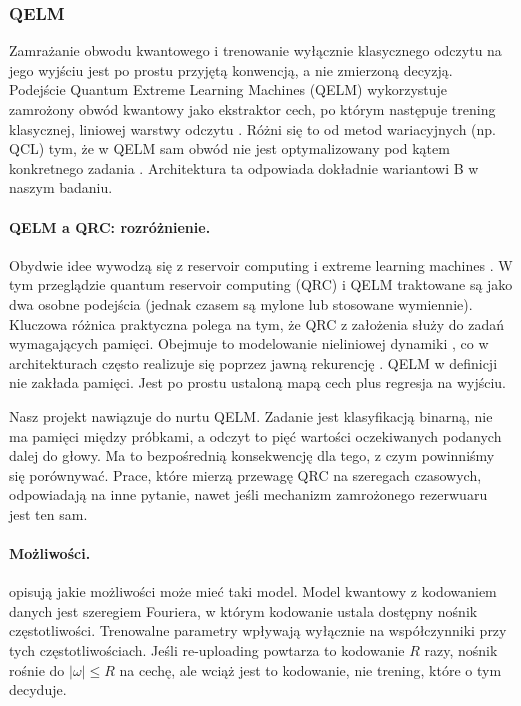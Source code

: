 \documentclass[11pt, a4paper]{article}
\begin{document}
\subsubsection{QELM}
Zamrażanie obwodu kwantowego i trenowanie wyłącznie klasycznego odczytu na jego wyjściu jest po prostu przyjętą konwencją, a nie zmierzoną decyzją. Podejście Quantum Extreme Learning Machines (QELM) wykorzystuje zamrożony obwód kwantowy jako ekstraktor cech, po którym następuje trening klasycznej, liniowej warstwy odczytu \citep{xiong2023}. Różni się to od metod wariacyjnych (np. QCL) tym, że w QELM sam obwód nie jest optymalizowany pod kątem konkretnego zadania \citep{sakurai2026}. Architektura ta odpowiada dokładnie wariantowi B w naszym badaniu.

\paragraph{QELM a QRC: rozróżnienie.}

Obydwie idee wywodzą się z reservoir computing i extreme learning machines \citep{mujal2021}. W tym przeglądzie quantum reservoir computing (QRC) i QELM traktowane są jako dwa osobne podejścia (jednak czasem są mylone lub stosowane wymiennie). Kluczowa różnica praktyczna polega na tym, że QRC z założenia służy do zadań wymagających pamięci. Obejmuje to modelowanie nieliniowej dynamiki \citep{fujii2017}, co w architekturach często realizuje się poprzez jawną rekurencję \citep{pandey2026b}. QELM w definicji \citet{xiong2023} nie zakłada pamięci. Jest po prostu ustaloną mapą cech plus regresja na wyjściu.

Nasz projekt nawiązuje do nurtu QELM. Zadanie jest klasyfikacją binarną, nie ma pamięci między próbkami, a odczyt to pięć wartości oczekiwanych podanych dalej do głowy. Ma to bezpośrednią konsekwencję dla tego, z czym powinniśmy się porównywać. Prace, które mierzą przewagę QRC na szeregach czasowych, odpowiadają na inne pytanie, nawet jeśli mechanizm zamrożonego rezerwuaru jest ten sam.

\paragraph{Możliwości.} \citet{schuld2021} opisują jakie możliwości może mieć taki model.  Model kwantowy z kodowaniem danych jest szeregiem Fouriera, w którym kodowanie ustala dostępny nośnik częstotliwości. Trenowalne parametry wpływają wyłącznie na współczynniki przy tych częstotliwościach. Jeśli re-uploading powtarza to kodowanie $R$ razy, nośnik rośnie do $|\omega| \le R$ na cechę, ale wciąż jest to kodowanie, nie trening, które o tym decyduje. 
\end{document}
